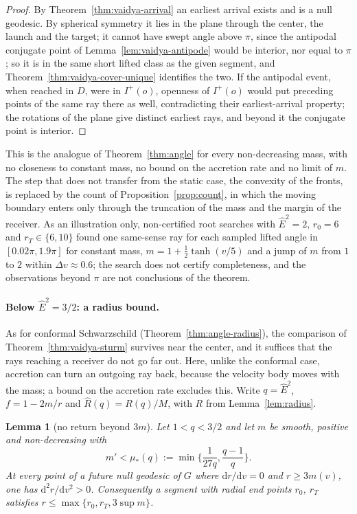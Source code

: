 \documentclass[aip,jmp,amsmath,amssymb,reprint]{revtex4-2}
\newcommand{\Ehat}{\hat E}
\newcommand{\dd}{\mathrm{d}}
\theoremstyle{plain}
\newtheorem{lemma}[proposition]{Lemma}
\theoremstyle{definition}
\begin{document}
\begin{proof}
By Theorem~\ref{thm:vaidya-arrival} an earliest arrival exists and is a null geodesic. By
spherical symmetry it lies in the plane through the center, the launch and the target; it
cannot have swept angle above $\pi$, since the antipodal conjugate point of
Lemma~\ref{lem:vaidya-antipode} would be interior, nor equal to $\pi$; so it is in the same short
lifted class as the given segment, and Theorem~\ref{thm:vaidya-cover-unique} identifies the two.
If the antipodal event, when reached in $D$, were in $I^+(o)$, openness of $I^+(o)$ would put
preceding points of the same ray there as well, contradicting their earliest-arrival property;
the rotations of the plane give distinct earliest rays, and beyond it the conjugate point is
interior.
\end{proof}

This is the analogue of Theorem~\ref{thm:angle} for every non-decreasing mass, with no
closeness to constant mass, no bound on the accretion rate and no limit of $m$. The step that
does not transfer from the static case, the convexity of the fronts, is replaced by the
count of Proposition~\ref{prop:count}, in which the moving boundary enters only through the
truncation of the mass and the margin of the receiver. As an illustration only, non-certified root searches with $\Ehat^2=2$,
$r_0=6$ and $r_T\in\{6,10\}$ found one same-sense ray for each sampled lifted angle in
$[0.02\pi,1.9\pi]$ for constant mass, $m=1+\frac12\tanh(v/5)$ and a jump of $m$ from $1$ to $2$ within
$\Delta v\approx0.6$; the search does not certify completeness, and the observations beyond $\pi$
are not conclusions of the theorem.

\paragraph{Below $\Ehat^2=3/2$: a radius bound.} As for conformal Schwarzschild
(Theorem~\ref{thm:angle-radius}), the comparison of Theorem~\ref{thm:vaidya-sturm} survives near the center,
and it suffices that the rays reaching a receiver do not go far out. Here, unlike the conformal case,
accretion can turn an outgoing ray back, because the velocity body moves with the mass; a bound on the
accretion rate excludes this. Write $q=\Ehat^2$, $f=1-2m/r$ and $\widehat R(q)=R(q)/M$, with $R$ from
Lemma~\ref{lem:radius}.

\begin{lemma}[no return beyond $3m$]\label{lem:vaidya-no-return}
Let $1<q<3/2$ and let $m$ be smooth, positive and non-decreasing with
\[
  m'<\mu_*(q):=\min\Big\{\frac1{27q},\frac{q-1}q\Big\}.
\]
At every point of a future null geodesic of $G$ where $\dd r/\dd v=0$ and $r\ge3m(v)$, one has
$\dd^2r/\dd v^2>0$. Consequently a segment with radial end points $r_0$, $r_T$ satisfies
$r\le\max\{r_0,r_T,3\sup m\}$.
\end{lemma}
\end{document}

